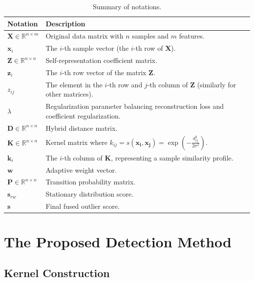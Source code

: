 \documentclass[ASNA,twocolumn]{USG} %
\begin{document}
\begin{table}[!ht]
\caption{Summary of notations.}\label{tab:notations}
\centering
    \begin{tabular}{ll} 
    \toprule
    \textbf{Notation} & \textbf{Description} \\
    \midrule
    $\boldsymbol{X} \in \mathbb{R}^{n \times m}$ & Original data matrix with $n$ samples and $m$ features. \\
    $\boldsymbol{x}_i$ & The $i$-th sample vector (the $i$-th row of $\boldsymbol{X}$). \\
    $\boldsymbol{Z} \in \mathbb{R}^{n \times n}$ & Self-representation coefficient matrix. \\
    $\boldsymbol{z}_i$ & The $i$-th row vector of the matrix $\boldsymbol{Z}$. \\
    $z_{ij}$ & The element in the $i$-th row and $j$-th column of $\boldsymbol{Z}$ (similarly for other matrices). \\
    $\lambda$ & Regularization parameter balancing reconstruction loss and coefficient regularization. \\
    $\boldsymbol{D} \in \mathbb{R}^{n \times n}$ & Hybrid distance matrix. \\
    $\boldsymbol{K} \in \mathbb{R}^{n \times n}$ & Kernel matrix where $k_{ij} = s\left(\boldsymbol{x_i}, \boldsymbol{x_j}\right)=\exp \left(-\frac{d_{i j}^2}{2 \sigma^2}\right)$. \\
    $\boldsymbol{k}_i$ & The $i$-th column of $\boldsymbol K$, representing a sample similarity profile. \\
    $\boldsymbol{w}$ & Adaptive weight vector. \\
    $\boldsymbol{P} \in \mathbb{R}^{n \times n}$ & Transition probability matrix. \\
    $\boldsymbol{s}_{rw}$ & Stationary distribution score. \\
    $\boldsymbol{s}$ & Final fused outlier score. \\
    \bottomrule
    \end{tabular}
\end{table}

\section{The Proposed Detection Method}

\subsection{Kernel Construction}
\end{document}
